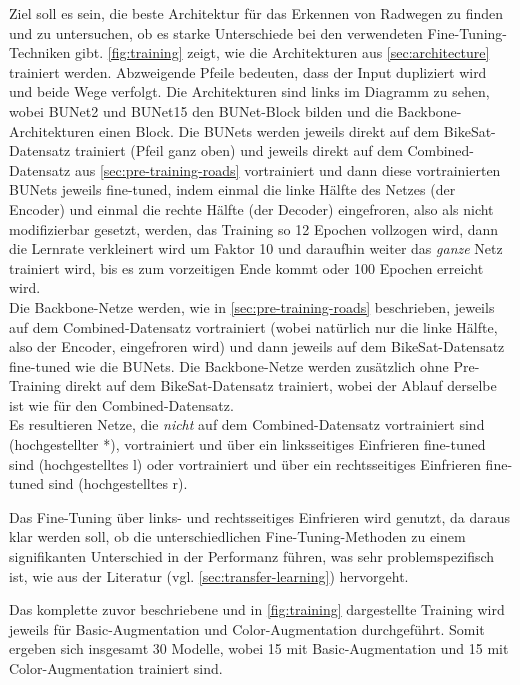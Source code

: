 Ziel soll es sein, die beste Architektur für das Erkennen von Radwegen zu finden und zu untersuchen,
ob es starke Unterschiede bei den verwendeten Fine-Tuning-Techniken gibt. 
\autoref{fig:training} zeigt, wie die Architekturen aus \autoref{sec:architecture} trainiert werden. 
Abzweigende Pfeile bedeuten, dass der Input dupliziert wird und beide Wege verfolgt. 
Die Architekturen sind links im Diagramm zu sehen, wobei \ac{BUNet2} und \ac{BUNet15} den \ac{BUNet}-Block 
bilden und die Backbone-Architekturen einen Block. Die \acp{BUNet} werden jeweils direkt auf 
dem BikeSat-Datensatz trainiert (Pfeil ganz oben) und jeweils direkt auf dem Combined-Datensatz aus \autoref{sec:pre-training-roads}
vortrainiert und dann diese vortrainierten \acp{BUNet} jeweils fine-tuned, indem einmal die linke Hälfte des 
Netzes (der Encoder) und einmal die rechte Hälfte (der Decoder) eingefroren, also als nicht modifizierbar gesetzt, werden,
das Training so 12 Epochen vollzogen wird, dann die Lernrate verkleinert wird um Faktor 10 und daraufhin weiter 
das \textit{ganze} Netz trainiert wird, bis es zum vorzeitigen Ende kommt oder 100 Epochen erreicht wird. \\
Die Backbone-Netze werden, wie in \autoref{sec:pre-training-roads} beschrieben, jeweils auf dem Combined-Datensatz vortrainiert
(wobei natürlich nur die linke Hälfte, also der Encoder, eingefroren wird) und dann jeweils auf dem BikeSat-Datensatz 
fine-tuned wie die \acp{BUNet}. Die Backbone-Netze werden zusätzlich ohne Pre-Training direkt auf dem BikeSat-Datensatz 
trainiert, wobei der Ablauf derselbe ist wie für den Combined-Datensatz. \\
Es resultieren Netze, die \textit{nicht} auf dem Combined-Datensatz vortrainiert sind (hochgestellter *), 
vortrainiert und über ein linksseitiges Einfrieren fine-tuned sind (hochgestelltes l) oder vortrainiert und über ein 
rechtsseitiges Einfrieren fine-tuned sind (hochgestelltes r). 

Das Fine-Tuning über links- und rechtsseitiges Einfrieren wird genutzt, da daraus klar werden soll, ob die unterschiedlichen 
Fine-Tuning-Methoden zu einem signifikanten Unterschied in der Performanz führen, was sehr problemspezifisch ist, 
wie aus der Literatur (vgl. \autoref{sec:transfer-learning}) hervorgeht. 

Das komplette zuvor beschriebene und in \autoref{fig:training} dargestellte Training wird jeweils für 
Basic-Augmentation und Color-Augmentation durchgeführt. Somit ergeben sich insgesamt 30 Modelle, 
wobei 15 mit Basic-Augmentation und 15 mit Color-Augmentation trainiert sind. 

